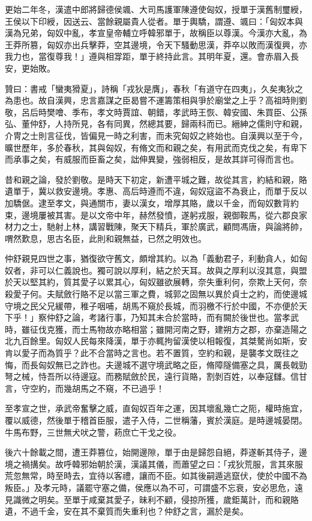 \begin{pinyinscope}
更始二年冬，漢遣中郎將歸德侯颯、大司馬護軍陳遵使匈奴，授單于漢舊制璽綬，王侯以下印綬，因送云、當餘親屬貴人從者。單于輿驕，謂遵、颯曰：「匈奴本與漢為兄弟，匈奴中亂，孝宣皇帝輔立呼韓邪單于，故稱臣以尊漢。今漢亦大亂，為王莽所篡，匈奴亦出兵擊莽，空其邊境，令天下騷動思漢，莽卒以敗而漢復興，亦我力也，當復尊我！」遵與相牚距，單于終持此言。其明年夏，還。會赤眉入長安，更始敗。

贊曰：書戒「蠻夷猾夏」，詩稱「戎狄是膺」，春秋「有道守在四夷」，久矣夷狄之為患也。故自漢興，忠言嘉謀之臣曷嘗不運籌策相與爭於廟堂之上乎？高祖時則劉敬，呂后時樊噲、季布，孝文時賈誼、朝錯，孝武時王恢、韓安國、朱買臣、公孫弘、董仲舒，人持所見，各有同異，然總其要，歸兩科而已。縉紳之儒則守和親，介冑之士則言征伐，皆偏見一時之利害，而未究匈奴之終始也。自漢興以至于今，曠世歷年，多於春秋，其與匈奴，有脩文而和親之矣，有用武而克伐之矣，有卑下而承事之矣，有威服而臣畜之矣，詘伸異變，強弱相反，是故其詳可得而言也。

昔和親之論，發於劉敬。是時天下初定，新遭平城之難，故從其言，約結和親，賂遺單于，冀以救安邊境。孝惠、高后時遵而不違，匈奴寇盜不為衰止，而單于反以加驕倨。逮至孝文，與通關市，妻以漢女，增厚其賂，歲以千金，而匈奴數背約束，邊境屢被其害。是以文帝中年，赫然發憤，遂躬戎服，親御鞍馬，從六郡良家材力之士，馳射上林，講習戰陳，聚天下精兵，軍於廣武，顧問馮唐，與論將帥，喟然歎息，思古名臣，此則和親無益，已然之明效也。

仲舒親見四世之事，猶復欲守舊文，頗增其約。以為「義動君子，利動貪人，如匈奴者，非可以仁義說也。獨可說以厚利，結之於天耳。故與之厚利以沒其意，與盟於天以堅其約，質其愛子以累其心，匈奴雖欲展轉，奈失重利何，奈欺上天何，奈殺愛子何。夫賦斂行賂不足以當三軍之費，城郭之固無以異於貞士之約，而使邊城守境之民父兄緩帶，稚子咽哺，胡馬不窺於長城，而羽檄不行於中國，不亦便於天下乎！」察仲舒之論，考諸行事，乃知其未合於當時，而有闕於後世也。當孝武時，雖征伐克獲，而士馬物故亦略相當；雖開河南之野，建朔方之郡，亦棄造陽之北九百餘里。匈奴人民每來降漢，單于亦輒拘留漢使以相報復，其桀驁尚如斯，安肯以愛子而為質乎？此不合當時之言也。若不置質，空約和親，是襲孝文既往之悔，而長匈奴無已之詐也。夫邊城不選守境武略之臣，脩障隧備塞之具，厲長戟勁弩之械，恃吾所以待邊寇。而務賦斂於民，遠行貨賂，割剝百姓，以奉寇讎。信甘言，守空約，而幾胡馬之不窺，不已過乎！

至孝宣之世，承武帝奮擊之威，直匈奴百年之運，因其壞亂幾亡之阨，權時施宜，覆以威德，然後單于稽首臣服，遣子入侍，二世稱藩，賓於漢庭。是時邊城晏閉。牛馬布野，三世無犬吠之警，菞庶亡干戈之役。

後六十餘載之間，遭王莽篡位，始開邊隙，單于由是歸怨自絕，莽遂斬其侍子，邊境之禍搆矣。故呼韓邪始朝於漢，漢議其儀，而蕭望之曰：「戎狄荒服，言其來服荒忽無常，時至時去，宜待以客禮，讓而不臣。如其後嗣遁逃竄伏，使於中國不為叛臣。」及孝元時，議罷守塞之備，侯應以為不可，可謂盛不忘衰，安必思危，遠見識微之明矣。至單于咸棄其愛子，昧利不顧，侵掠所獲，歲鉅萬計，而和親賂遺，不過千金，安在其不棄質而失重利也？仲舒之言，漏於是矣。


\end{pinyinscope}
